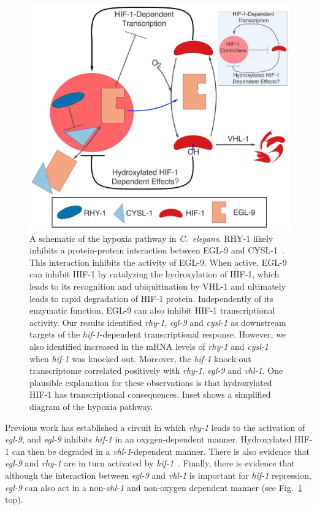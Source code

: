 \documentclass[9pt,twocolumn,twoside]{pnas-new}
\newcommand{\cel}{\emph{C.~elegans}}
\newcommand{\egl}{\emph{egl-9}}
\newcommand{\cysl}{\emph{cysl-1}}
\newcommand{\rhy}{\emph{rhy-1}}
\newcommand{\vhl}{\emph{vhl-1}}
\newcommand{\hif}{\emph{hif-1}}
\newcommand{\eglp}{EGL-9}
\newcommand{\rhyp}{RHY-1}
\newcommand{\vhlp}{VHL-1}
\newcommand{\hifp}{HIF-1}
\newcommand{\cyslp}{CYSL-1}
\begin{document}
\begin{figure}[tbhp]
\centering
\includegraphics[width=\linewidth]{figs/new_model.pdf}
\caption{
A schematic of the hypoxia pathway in \cel{}. \rhyp{} likely inhibits a
protein-protein interaction between \eglp{} and \cyslp{}~\cite{Ma2012}. This
interaction inhibits the activity of \eglp{}. When active, \eglp{} can inhibit
\hifp{} by catalyzing the hydroxylation of \hifp{}, which leads to its
recognition and ubiquitination by \vhlp{} and ultimately leads to rapid
degradation of \hifp{} protein. Independently of its enzymatic function,
\eglp{} can also inhibit \hifp{} transcriptional activity. Our results identified
\rhy{}, \egl{} and \cysl{} as downstream targets of the \hif{}-dependent
transcriptional response.
However, we also identified increased in the mRNA levels of \rhy{} and \cysl{}
when \hif{} was knocked out.
Moreover, the \hif{} knock-out transcriptome correlated positively with \rhy{},
\egl{} and \vhl{}. One plausible explanation for these observations is that
hydroxylated \hifp{} has transcriptional consequences.
Inset shows a simplified diagram of the hypoxia pathway.
}
\label{fig:newmodel}
\end{figure}

Previous work has established a circuit in which \rhy{} leads to the activation
of \egl{}, and \egl{} inhibits \hif{} in an oxygen-dependent manner. Hydroxylated
\hifp{} can then be degraded in a \vhl{}-dependent manner. There is also evidence
that \egl{} and \rhy{} are in turn activated by \hif{}~\cite{Bishop2004,
Powell-Coffman2010}.
Finally, there is evidence that although the interaction between \egl{} and
\vhl{} is important for \hif{} repression, \egl{} can also act in a non-\vhl{}
and non-oxygen dependent manner (see Fig.~\ref{fig:newmodel} top).
\end{document}
